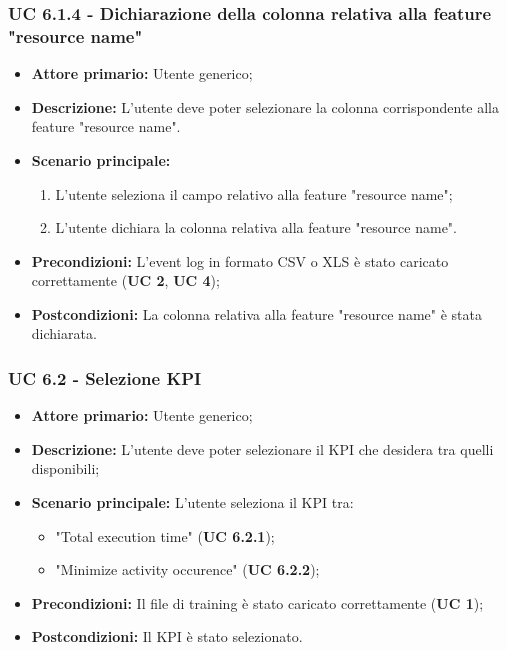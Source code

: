 \subsubsection{UC 6.1.4 - Dichiarazione della colonna relativa alla feature "resource name"}
\begin{itemize}
	\item \textbf{Attore primario:} Utente generico;
	\item \textbf{Descrizione:} L'utente deve poter selezionare la colonna corrispondente alla feature "resource name".
	\item \textbf{Scenario principale:} 
		\begin{enumerate}
			\item L'utente seleziona il campo relativo alla feature "resource name";
			\item L'utente dichiara la colonna relativa alla feature "resource name".
		\end{enumerate}
	\item \textbf{Precondizioni:}  L'event log in formato CSV o XLS è stato caricato correttamente (\textbf{UC 2}, \textbf{UC 4});
	\item \textbf{Postcondizioni:} La colonna relativa alla feature "resource name" è stata dichiarata.
\end{itemize}


\subsubsection{UC 6.2 - Selezione KPI}
\begin{itemize}
	\item \textbf{Attore primario:} Utente generico;
	\item \textbf{Descrizione:} L'utente deve poter selezionare il KPI che desidera tra quelli disponibili;
	\item \textbf{Scenario principale:} L'utente seleziona il KPI tra:
		\begin{itemize}
			\item "Total execution time" (\textbf{UC 6.2.1});
			\item "Minimize activity occurence" (\textbf{UC 6.2.2});
		\end{itemize}
	\item \textbf{Precondizioni:} Il file di training è stato caricato correttamente (\textbf{UC 1});
	\item \textbf{Postcondizioni:} Il KPI è stato selezionato.
\end{itemize}

